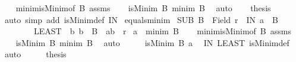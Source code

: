 \begin{isabellebody}
%
\isadelimproof
%
\endisadelimproof
%
\isatagproof
{}\isamarkupfalse%
{\isacharminus}{\kern0pt}\isanewline
\ \ \isamarkupfalse%
\ minim{\isacharunderscore}{\kern0pt}isMinim{\isacharbrackleft}{\kern0pt}of\ B{\isacharbrackright}{\kern0pt}\ assms\isanewline
\ \ \isamarkupfalse%
\ {\isachardoublequoteopen}isMinim\ B\ {\isacharparenleft}{\kern0pt}minim\ B{\isacharparenright}{\kern0pt}{\isachardoublequoteclose}\ \isamarkupfalse%
\ auto\isanewline
\ \ \isamarkupfalse%
\ {\isacharquery}{\kern0pt}thesis\ \isamarkupfalse%
\ {\isacharparenleft}{\kern0pt}auto\ simp\ add{\isacharcolon}{\kern0pt}\ isMinim{\isacharunderscore}{\kern0pt}def\ IN{\isacharparenright}{\kern0pt}\isanewline
{}\isamarkupfalse%
%
\endisatagproof
{\isafoldproof}%
%
\isadelimproof
\isanewline
%
\endisadelimproof
\isanewline
{}\isamarkupfalse%
\ equals{\isacharunderscore}{\kern0pt}minim{\isacharcolon}{\kern0pt}\isanewline
{}\ SUB{\isacharcolon}{\kern0pt}\ {\isachardoublequoteopen}B\ {\isasymle}\ Field\ r{\isachardoublequoteclose}\ \ IN{\isacharcolon}{\kern0pt}\ {\isachardoublequoteopen}a\ {\isasymin}\ B{\isachardoublequoteclose}\ \isanewline
\ \ \ \ \ \ \ \ LEAST{\isacharcolon}{\kern0pt}\ {\isachardoublequoteopen}{\isasymAnd}\ b{\isachardot}{\kern0pt}\ b\ {\isasymin}\ B\ {\isasymLongrightarrow}\ {\isacharparenleft}{\kern0pt}a{\isacharcomma}{\kern0pt}b{\isacharparenright}{\kern0pt}\ {\isasymin}\ r{\isachardoublequoteclose}\isanewline
{}\ {\isachardoublequoteopen}a\ {\isacharequal}{\kern0pt}\ minim\ B{\isachardoublequoteclose}\isanewline
%
\isadelimproof
%
\endisadelimproof
%
\isatagproof
{}\isamarkupfalse%
{\isacharminus}{\kern0pt}\isanewline
\ \ \isamarkupfalse%
\ minim{\isacharunderscore}{\kern0pt}isMinim{\isacharbrackleft}{\kern0pt}of\ B{\isacharbrackright}{\kern0pt}\ assms\isanewline
\ \ \isamarkupfalse%
\ {\isachardoublequoteopen}isMinim\ B\ {\isacharparenleft}{\kern0pt}minim\ B{\isacharparenright}{\kern0pt}{\isachardoublequoteclose}\ \isamarkupfalse%
\ auto\isanewline
\ \ \isamarkupfalse%
\ \isamarkupfalse%
\ {\isachardoublequoteopen}isMinim\ B\ a{\isachardoublequoteclose}\ \isamarkupfalse%
\ IN\ LEAST\ isMinim{\isacharunderscore}{\kern0pt}def\ \isamarkupfalse%
\ auto\isanewline
\ \ \isamarkupfalse%
\ \isamarkupfalse%
\ {\isacharquery}{\kern0pt}thesis\isanewline

\end{isabellebody}
